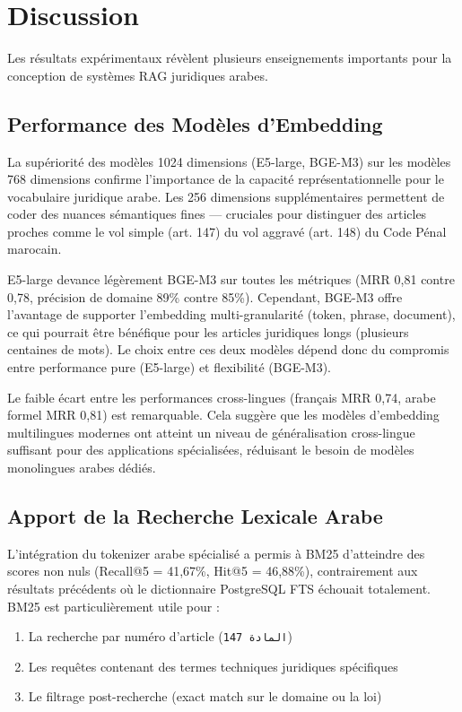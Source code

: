 \section{Discussion}

Les résultats expérimentaux révèlent plusieurs enseignements importants
pour la conception de systèmes RAG juridiques arabes.

\subsection{Performance des Modèles d'Embedding}

La supériorité des modèles 1024 dimensions (E5-large, BGE-M3) sur les
modèles 768 dimensions confirme l'importance de la capacité représentationnelle
pour le vocabulaire juridique arabe. Les 256 dimensions supplémentaires
permettent de coder des nuances sémantiques fines — cruciales pour
distinguer des articles proches comme le vol simple (art. 147) du vol
aggravé (art. 148) du Code Pénal marocain.

E5-large devance légèrement BGE-M3 sur toutes les métriques (MRR 0,81
contre 0,78, précision de domaine 89\% contre 85\%). Cependant, BGE-M3
offre l'avantage de supporter l'embedding multi-granularité (token, phrase,
document), ce qui pourrait être bénéfique pour les articles juridiques longs
(plusieurs centaines de mots). Le choix entre ces deux modèles dépend donc
du compromis entre performance pure (E5-large) et flexibilité (BGE-M3).

Le faible écart entre les performances cross-lingues (français MRR 0,74,
arabe formel MRR 0,81) est remarquable. Cela suggère que les modèles
d'embedding multilingues modernes ont atteint un niveau de généralisation
cross-lingue suffisant pour des applications spécialisées, réduisant le
besoin de modèles monolingues arabes dédiés.

\subsection{Apport de la Recherche Lexicale Arabe}

L'intégration du tokenizer arabe spécialisé a permis à BM25 d'atteindre
des scores non nuls (Recall@5 = 41,67\%, Hit@5 = 46,88\%), contrairement
aux résultats précédents où le dictionnaire PostgreSQL FTS échouait
totalement. BM25 est particulièrement utile pour :

\begin{enumerate}
    \item La recherche par numéro d'article (\texttt{المادة 147})
    \item Les requêtes contenant des termes techniques juridiques spécifiques
    \item Le filtrage post-recherche (exact match sur le domaine ou la loi)
\end{enumerate}

